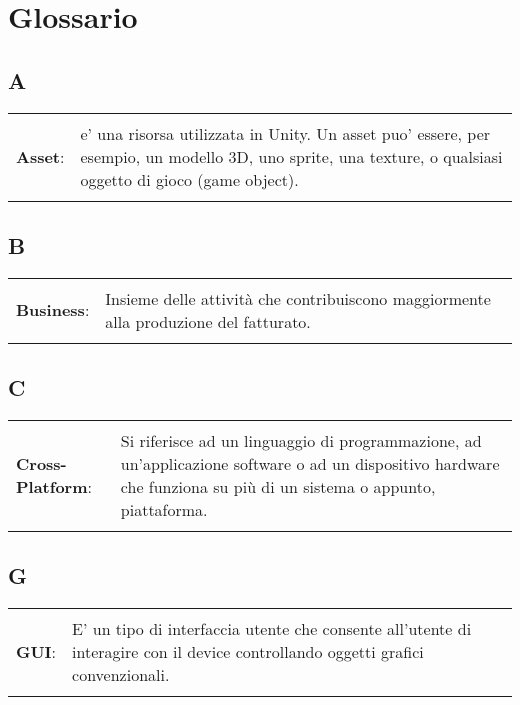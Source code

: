 \setcounter{secnumdepth}{0}
\thispagestyle{empty}
\section{Glossario}

\allsectionsfont{\raggedleft\huge}


\subsection{A}{
	\normalsize
	\begin{longtable}{p{} p{}} 
		\\
		\textbf{Asset}:		&	 e' una risorsa utilizzata in Unity. Un asset puo' essere, per esempio, un modello 3D, uno sprite, una texture, o qualsiasi oggetto di gioco (game object).\\
	\end{longtable}



\subsection{B}{
	\normalsize
	\begin{longtable}{p{} p{}} 
		\\
		\textbf{Business}:		&	 Insieme delle attività che contribuiscono maggiormente alla produzione del fatturato.\\
	\end{longtable}

\subsection{C}{
	\normalsize
	\begin{longtable}{p{} p{}} 
		\\
		\textbf{Cross-Platform}:		&	 Si riferisce ad un linguaggio di programmazione, ad un'applicazione software o ad un dispositivo hardware che funziona su più di un sistema o appunto, piattaforma.\\
	\end{longtable}
	
	\subsection{G}{
		\normalsize
		\begin{longtable}{p{} p{}} 
			\\
			\textbf{GUI}:		&	 E' un tipo di interfaccia utente che consente all'utente di interagire con il device controllando oggetti grafici convenzionali.\\
		\end{longtable}

}}}}

